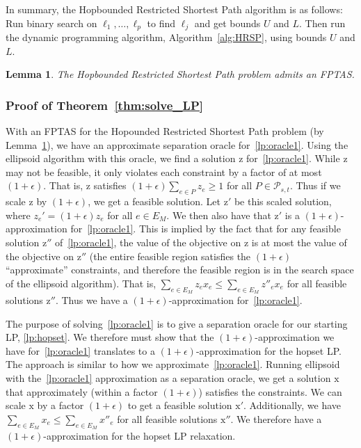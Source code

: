 \documentclass{article}
\newtheorem{lemma}[theorem]{Lemma}
\theoremstyle{definition}
\theoremstyle{remark}
\newcommand{\quotes}[1]{``#1''}
\begin{document}
In summary, the Hopbounded Restricted Shortest Path algorithm is as follows: Run binary search on $\ell_1, \dots, \ell_p$ to find $\ell_j$ and get bounds $U$ and $L$. Then run the dynamic programming algorithm, Algorithm~\ref{alg:HRSP}, using bounds $U$ and $L$.
\else \fi

\begin{lemma} \label{lem:FPTAS_HRSP}
    The Hopbounded Restricted Shortest Path problem admits an FPTAS.
\end{lemma}

\subsubsection{Proof of Theorem~\ref{thm:solve_LP}}
With an FPTAS for the Hopounded Restricted Shortest Path problem (by Lemma~\ref{lem:FPTAS_HRSP}), we have an approximate separation oracle for~\ref{lp:oracle1}. Using the ellipsoid algorithm with this oracle, we find a solution $\bm{\mathrm{z}}$ for~\ref{lp:oracle1}. While $\bm{\mathrm{z}}$ may not be feasible, it only violates each constraint by a factor of at most $(1+\epsilon)$. That is, $\bm{\mathrm{z}}$ satisfies $(1+\epsilon) \sum_{e \in P}  z_e \geq 1$ for all $P \in \mathcal{P}_{s,t}$. Thus if we scale $\bm{\mathrm{z}}$ by $(1+\epsilon)$, we get a feasible solution. Let $\bm{\mathrm{z'}}$ be this scaled solution, where $z_e' = (1+\epsilon) z_e$ for all $e \in E_M$. We then also have that $\bm{\mathrm{z'}}$ is a $(1+\epsilon)$-approximation for~\ref{lp:oracle1}. This is implied by the fact that for any feasible solution $\bm{\mathrm{z''}}$ of~\ref{lp:oracle1}, the value of the objective on $\bm{\mathrm{z}}$ is at most the value of the objective on $\bm{\mathrm{z''}}$ (the entire feasible region satisfies the $(1+\epsilon)$ \quotes{approximate} constraints, and therefore the feasible region is in the search space of the ellipsoid algorithm). That is, $\sum_{e \in E_M}  z_e x_e \leq \sum_{e \in E_M}  z''_e x_e$ for all feasible solutions $\bm{\mathrm{z''}}$.  Thus we have a $(1+\epsilon)$-approximation for~\ref{lp:oracle1}.

The purpose of solving~\ref{lp:oracle1} is to give a separation oracle for our starting LP, \ref{lp:hopset}. We therefore must show that the $(1+\epsilon)$-approximation we have for~\ref{lp:oracle1} translates to a $(1+\epsilon)$-approximation for the hopset LP. The approach is similar to how we approximate~\ref{lp:oracle1}. Running ellipsoid with the~\ref{lp:oracle1} approximation as a separation oracle, we get a solution $\bm{\mathrm{x}}$ that approximately (within a factor $(1+\epsilon)$) satisfies the constraints. We can scale $\bm{\mathrm{x}}$ by a factor $(1+\epsilon)$ to get a feasible solution $\bm{\mathrm{x'}}$. Additionally, we have $\sum_{e \in E_M} x_e \leq \sum_{e \in E_M} x''_e$ for all feasible solutions $\bm{\mathrm{x''}}$. We therefore have a $(1+\epsilon)$-approximation for the hopset LP relaxation. 
\end{document}
